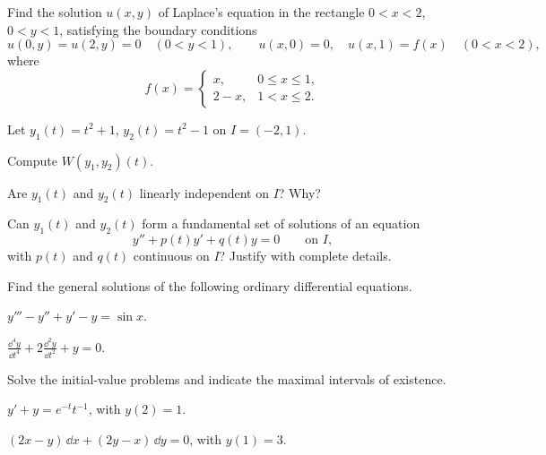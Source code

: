 \documentclass[11pt,oneside]{article}
\begin{document}
\begin{problem}
Find the solution $u(x,y)$ of Laplace's equation in the rectangle $0<x<2$, $0<y<1$, satisfying the boundary conditions
\[
u(0,y)=u(2,y)=0\quad(0<y<1),\qquad
u(x,0)=0,\quad u(x,1)=f(x)\quad(0<x<2),
\]
where
\[
f(x)=\begin{cases}x,&0\le x\le1,\\2-x,&1<x\le2.\end{cases}
\]
\end{problem}

\begin{problem}
Let $y_1(t)=t^2+1$, $y_2(t)=t^2-1$ on $I=(-2,1)$.
\begin{problemsubparts}
\item Compute $W(y_1,y_2)(t)$.
\item Are $y_1(t)$ and $y_2(t)$ linearly independent on $I$? Why?
\item Can $y_1(t)$ and $y_2(t)$ form a fundamental set of solutions of an equation
\[
y''+p(t)y'+q(t)y=0\qquad\text{on }I,
\]
with $p(t)$ and $q(t)$ continuous on $I$? Justify with complete details.
\end{problemsubparts}
\end{problem}

\begin{problem}
Find the general solutions of the following ordinary differential equations.
\begin{problemsubparts}
\item $y'''-y''+y'-y=\sin x$.
\item $\displaystyle\frac{\dd^4y}{\dd t^4}+2\frac{\dd^2y}{\dd t^2}+y=0$.
\end{problemsubparts}
\end{problem}

\begin{problem}
Solve the initial-value problems and indicate the maximal intervals of existence.
\begin{problemsubparts}
\item $y'+y=e^{-t}t^{-1}$, with $y(2)=1$.
\item $(2x-y)\,\dd x+(2y-x)\,\dd y=0$, with $y(1)=3$.
\end{problemsubparts}
\end{problem}
\end{document}
